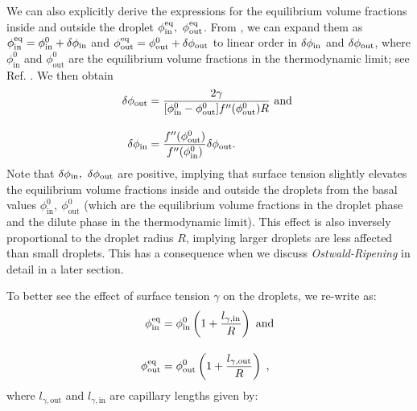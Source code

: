 We can also explicitly derive the expressions for the equilibrium volume fractions inside and outside the droplet $\phi^\mathrm{eq}_\mathrm{in},~\phi^\mathrm{eq}_\mathrm{out}$.
From , we can expand them as $\phi^\mathrm{eq}_\mathrm{in} = \phi^0_\mathrm{in} + \delta \phi_\mathrm{in}$ and $\phi^\mathrm{eq}_\mathrm{out} = \phi^0_\mathrm{out} + \delta \phi_\mathrm{out}$ to linear order in $\delta \phi_\mathrm{in}$ and $\delta \phi_\mathrm{out}$, where $\phi^0_\mathrm{in}$ and $\phi^0_\mathrm{out}$ are the equilibrium volume fractions in the thermodynamic limit; see Ref. \cite{Review2019}.
We then obtain
\begin{subequations}
\label{eqn:delta_phi_in_out}
\begin{align}
    \delta \phi_\mathrm{out} &= \frac{2 \gamma}{[\phi^{0}_\mathrm{in} - \phi^{0}_\mathrm{out}] f''(\phi^{0}_\mathrm{out}) R} \mathrm{~and~}
    \\[10pt]
    \delta \phi_\mathrm{in} &= \frac{f''(\phi^{0}_\mathrm{out})}{f''(\phi^{0}_\mathrm{in})} \delta \phi_\mathrm{out}.
\end{align}
\end{subequations}
Note that $\delta \phi_\mathrm{in},~\delta \phi_\mathrm{out}$ are positive, implying that surface tension slightly elevates the equilibrium volume fractions inside and outside the droplets from the basal values $\phi^{0}_\mathrm{in},~\phi^{0}_\mathrm{out}$ (which are the equilibrium volume fractions in the droplet phase and the dilute phase in the thermodynamic limit).
This effect is also inversely proportional to the droplet radius $R$, implying larger droplets are less affected than small droplets. 
This has a consequence when we discuss \textit{Ostwald-Ripening} in detail in a later section. 

To better see the effect of surface tension $\gamma$ on the droplets, we re-write  as:
\begin{subequations}
\label{eqn:GibbsThompsonRelations}
\begin{align}
    \phi^\mathrm{eq}_\mathrm{in} &= \phi^{0}_\mathrm{in} \left (1 + \frac{l_{\gamma, \mathrm{in}}}{R} \right )
    \mathrm{~and~}
    \\[10pt]
    \phi^\mathrm{eq}_\mathrm{out} &= \phi^{0}_\mathrm{out} \left ( 1 + \frac{l_{\gamma, \mathrm{out}}}{R}\right )
    \;,
\end{align}
\end{subequations}
where $l_{\gamma, \mathrm{out}}$ and $l_{\gamma, \mathrm{in}}$ are capillary lengths given by:

